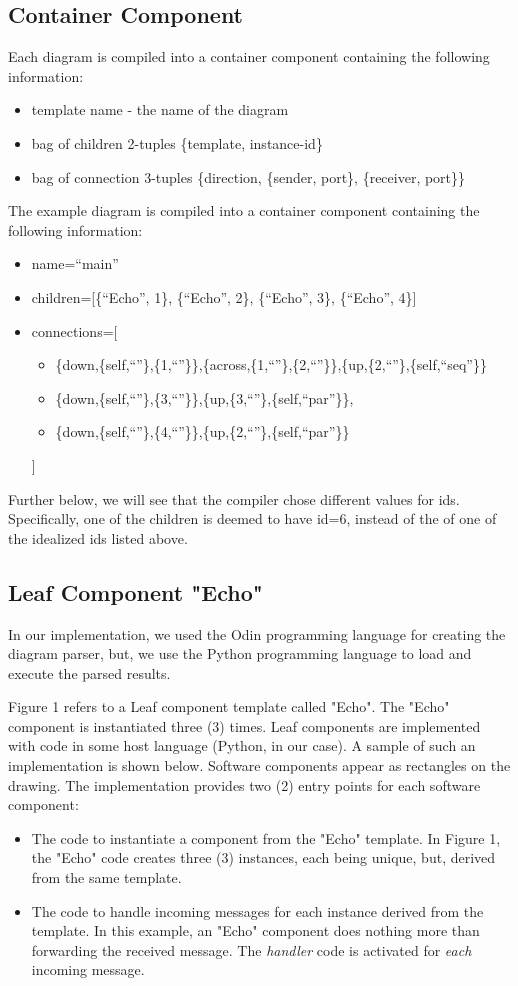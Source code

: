 \documentclass[10pt,anonymous,review]{acmart}
\begin{document}
\subsection{Container Component}
Each diagram is compiled into a container component containing the following information:
\begin{itemize}
\item template name - the name of the diagram
\item bag of children 2-tuples \{template, instance-id\}
\item bag of connection 3-tuples \{direction, \{sender, port\}, \{receiver, port\}\}
\end{itemize}
The example diagram is compiled into a container component containing the following information:
\begin{itemize}
\item name=“main”
\item children=[\{“Echo”, 1\}, \{“Echo”, 2\}, \{“Echo”, 3\}, \{“Echo”, 4\}]
\item connections=[
\begin{itemize}
  \item[] \{down,\{self,``''\},\{1,``”\}\},\{across,\{1,``”\},\{2,``”\}\},\{up,\{2,``”\},\{self,``seq''\}\}
  \item[] \{down,\{self,``”\},\{3,``”\}\},\{up,\{3,``”\},\{self,``par”\}\},
  \item[] \{down,\{self,``”\},\{4,``”\}\},\{up,\{2,``”\},\{self,``par”\}\}
\end{itemize}
]
\end{itemize}
Further below, we will see that the compiler chose different values for ids.
Specifically, one of the children is deemed to have id=6, instead of the of one of the idealized ids listed above.


\subsection{Leaf Component "Echo"}
In our implementation, we used the Odin programming language for
creating the diagram parser, but, we use the Python programming
language to load and execute the parsed results.

Figure 1 refers to a Leaf component template called "Echo". The "Echo"
component is instantiated three (3) times. Leaf components are
implemented with code in some host language (Python, in our case). A
sample of such an implementation is shown below. Software components
appear as rectangles on the drawing. The implementation provides two (2)
entry points for each software component:
\begin{itemize}
\item The code to instantiate a component from the "Echo" template. In Figure
1, the "Echo" code creates three (3) instances, each being unique, but,
derived from the same template.

\item The code to handle incoming messages for each instance derived from the
template. In this example, an "Echo" component does nothing more than
forwarding the received message. The \emph{handler} code is activated for
\emph{each} incoming message.
\end{itemize}
\end{document}
